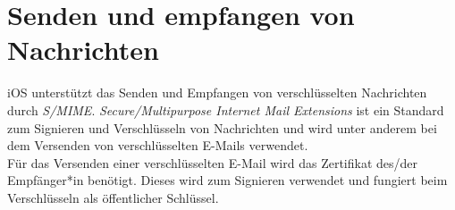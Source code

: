\section{Senden und empfangen von Nachrichten}

iOS unterstützt das Senden und Empfangen von verschlüsselten Nachrichten durch \textit{S/MIME}. \textit{Secure/Multipurpose Internet Mail Extensions} ist ein Standard zum Signieren und Verschlüsseln von Nachrichten und wird unter anderem bei dem Versenden von verschlüsselten E-Mails verwendet. \\
Für das Versenden einer verschlüsselten E-Mail wird das Zertifikat des/der Empfänger*in benötigt. Dieses wird zum Signieren verwendet und fungiert beim Verschlüsseln als öffentlicher Schlüssel.
